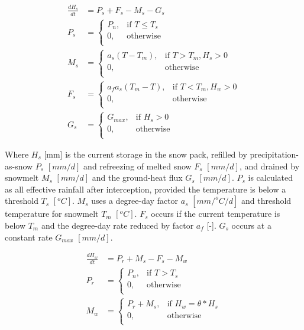 \begin{align}
	\frac{dH_s}{dt} &= P_s + F_s - M_s - G_s\\
	P_s &= \begin{cases}
		P_n, &\text{if } T \leq T_s \\
		0, & \text{otherwise} \\
	\end{cases} \\
	M_s &= \begin{cases}
		a_s(T-T_m), &\text{if } T > T_m, H_s > 0 \\
		0, &\text{otherwise}\\
	\end{cases}	\\
	F_s &= \begin{cases}
		a_fa_s(T_m-T), &\text{if } T < T_m, H_w > 0 \\
		0, &\text{otherwise}\\
	\end{cases} \\
	G_s &= \begin{cases}
		G_{max}, &\text{if } H_s > 0 \\
		0, &\text{otherwise} \\
	\end{cases} 
\end{align}

Where $H_s$ [mm] is the current storage in the snow pack, refilled by precipitation-as-snow $P_s$ $[mm/d]$ and refreezing of melted snow $F_s$ $[mm/d]$, and drained by snowmelt $M_s$ $[mm/d]$ and the ground-heat flux $G_s$ $[mm/d]$.
$P_s$ is calculated as all effective rainfall after interception, provided the temperature is below a threshold $T_s$ $[^oC]$.
$M_s$ uses a degree-day factor $a_s$ $[mm/^oC/d]$ and threshold temperature for snowmelt $T_m$ $[^oC]$.
$F_s$ occurs if the current temperature is below $T_m$ and the degree-day rate reduced by factor $a_f$ [-].
$G_s$ occurs at a constant rate $G_{max}$ $[mm/d]$.

\begin{align}
	\frac{dH_w}{dt} &= P_r +M_s-F_s-M_w \\
	P_r &= \begin{cases}
		P_n, &\text{if } T > T_s \\
		0, & \text{otherwise} \\
	\end{cases} \\
	M_w &=\begin{cases}
		P_r + M_s, &\text{if } H_w = \theta*H_s \\
		0, & \text{otherwise} \\
	\end{cases} 
\end{align}
  
